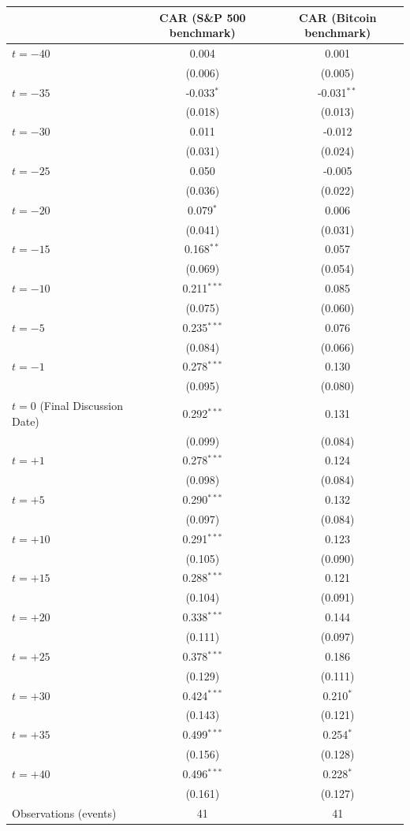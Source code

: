\begin{tabular}{lcc}
\toprule
 & CAR (S\&P 500 benchmark) & CAR (Bitcoin benchmark) \\
\midrule
\quad $t=-40$ & 0.004 & 0.001 \\
 & (0.006) & (0.005) \\
\quad $t=-35$ & -0.033$^{*}$ & -0.031$^{**}$ \\
 & (0.018) & (0.013) \\
\quad $t=-30$ & 0.011 & -0.012 \\
 & (0.031) & (0.024) \\
\quad $t=-25$ & 0.050 & -0.005 \\
 & (0.036) & (0.022) \\
\quad $t=-20$ & 0.079$^{*}$ & 0.006 \\
 & (0.041) & (0.031) \\
\quad $t=-15$ & 0.168$^{**}$ & 0.057 \\
 & (0.069) & (0.054) \\
\quad $t=-10$ & 0.211$^{***}$ & 0.085 \\
 & (0.075) & (0.060) \\
\quad $t=-5$ & 0.235$^{***}$ & 0.076 \\
 & (0.084) & (0.066) \\
\quad $t=-1$ & 0.278$^{***}$ & 0.130 \\
 & (0.095) & (0.080) \\
\quad $t=0$ (Final Discussion Date) & 0.292$^{***}$ & 0.131 \\
 & (0.099) & (0.084) \\
\quad $t=+1$ & 0.278$^{***}$ & 0.124 \\
 & (0.098) & (0.084) \\
\quad $t=+5$ & 0.290$^{***}$ & 0.132 \\
 & (0.097) & (0.084) \\
\quad $t=+10$ & 0.291$^{***}$ & 0.123 \\
 & (0.105) & (0.090) \\
\quad $t=+15$ & 0.288$^{***}$ & 0.121 \\
 & (0.104) & (0.091) \\
\quad $t=+20$ & 0.338$^{***}$ & 0.144 \\
 & (0.111) & (0.097) \\
\quad $t=+25$ & 0.378$^{***}$ & 0.186 \\
 & (0.129) & (0.111) \\
\quad $t=+30$ & 0.424$^{***}$ & 0.210$^{*}$ \\
 & (0.143) & (0.121) \\
\quad $t=+35$ & 0.499$^{***}$ & 0.254$^{*}$ \\
 & (0.156) & (0.128) \\
\quad $t=+40$ & 0.496$^{***}$ & 0.228$^{*}$ \\
 & (0.161) & (0.127) \\
\midrule
Observations (events) & 41 & 41 \\
\bottomrule
\end{tabular}

